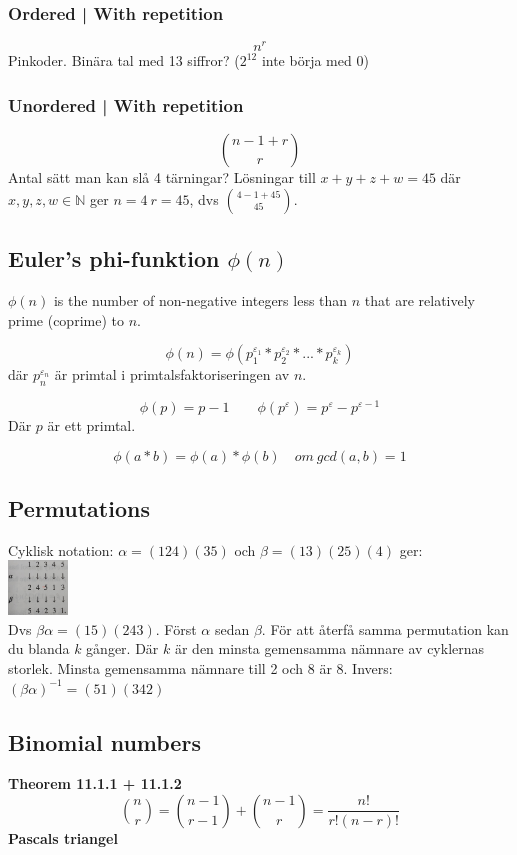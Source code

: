 \documentclass{article}
\begin{document}
\begin{multicols}{2}
{\begin{minipage}{28em}
\subsubsection{Ordered | With repetition}
$$n^r$$
Pinkoder. Binära tal med 13 siffror? ($2^{12}$ inte börja med 0)
\subsubsection{Unordered | With repetition}
$$\binom{n-1+r}{r}$$
Antal sätt man kan slå 4 tärningar? Lösningar till $x + y + z + w = 45$ där $x,y,z,w \in \mathbb{N}$ ger $n=4 \ r=45$, dvs $\binom{4-1+45}{45}$.

\end{minipage}}

\subsection{Euler's phi-funktion $\phi(n)$}

$\phi(n)$ is the number of non-negative integers less than $n$ that are relatively prime (coprime) to $n$.

$$\phi(n)=\phi(p^{\varepsilon_1}_1*p^{\varepsilon_2}_2*...*p^{\varepsilon_k}_k)$$
där $p^{\varepsilon_n}_n$ är primtal i primtalsfaktoriseringen av $n$.

$$\phi(p) = p-1 \quad \quad \phi(p^\varepsilon) = p^\varepsilon-p^{\varepsilon-1}$$
Där $p$ är ett primtal.

$$\phi(a*b) = \phi(a)*\phi(b) \quad om \ gcd(a,b)=1$$

\subsection{Permutations}

Cyklisk notation: $\alpha = (124)(35)$ och $\beta = (13)(25)(4)$ ger:\\
\includegraphics[width=0.12\textwidth]{images/partition}\\ Dvs $\beta \alpha = (15)(243)$. Först $\alpha$ sedan $\beta$. 
För att återfå samma permutation kan du blanda $k$ gånger. Där $k$ är den minsta gemensamma nämnare av cyklernas storlek. Minsta gemensamma nämnare till 2 och 8 är 8. Invers: $(\beta \alpha)^{-1} = (51)(342)$

\subsection{Binomial numbers}
\textbf{Theorem 11.1.1 + 11.1.2}
$$\binom{n}{r} = \binom{n-1}{r-1} + \binom{n-1}{r} = \frac{n!}{r!(n-r)!}$$
\newline
\textbf{Pascals triangel}
\hspace{10pt}


\end{multicols}
\end{document}
